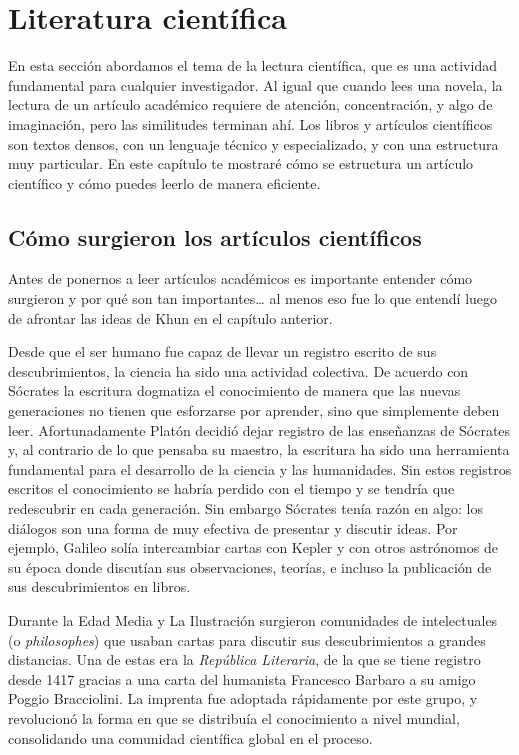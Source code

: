 \chapter{Literatura científica}
\label{cha:literaturacientifica}

En esta sección abordamos el tema de la lectura científica, que es una actividad
fundamental para cualquier investigador.
Al igual que cuando lees una novela, la lectura de un artículo académico
requiere de atención, concentración, y algo de imaginación, pero las similitudes
terminan ahí.
Los libros y artículos científicos son textos densos, con un lenguaje técnico y
especializado, y con una estructura muy particular.
En este capítulo te mostraré cómo se estructura un artículo científico y cómo
puedes leerlo de manera eficiente.

\section{Cómo surgieron los artículos científicos}
\label{sec:contexto}
Antes de ponernos a leer artículos académicos es importante entender cómo
surgieron y por qué son tan importantes… al menos eso fue lo que entendí luego
de afrontar las ideas de Khun en el capítulo anterior.

Desde que el ser humano fue capaz de llevar un registro escrito de sus
descubrimientos, la ciencia ha sido una actividad colectiva.
De acuerdo con Sócrates la escritura dogmatiza el conocimiento de manera que las
nuevas generaciones no tienen que esforzarse por aprender, sino que simplemente
deben leer.
Afortunadamente Platón decidió dejar registro de las enseñanzas de Sócrates y,
al contrario de lo que pensaba su maestro, la escritura ha sido una herramienta
fundamental para el desarrollo de la ciencia y las humanidades.
Sin estos registros escritos el conocimiento se habría perdido con el tiempo y
se tendría que redescubrir en cada generación.
Sin embargo Sócrates tenía razón en algo: los diálogos son una forma de
muy efectiva de presentar y discutir ideas.
Por ejemplo, Galileo solía intercambiar cartas con Kepler y con otros astrónomos
de su época donde discutían sus observaciones, teorías, e incluso la publicación
de sus descubrimientos en libros.

Durante la Edad Media y La Ilustración surgieron comunidades de intelectuales (o
\emph{philosophes}) que usaban cartas para discutir sus descubrimientos a
grandes distancias.
Una de estas era la \emph{República Literaria}, de la que se tiene registro
desde 1417 gracias a una carta del humanista Francesco Barbaro a su amigo Poggio
Bracciolini.
La imprenta fue adoptada rápidamente por este grupo, y revolucionó la forma en
que se distribuía el conocimiento a nivel mundial, consolidando una comunidad
científica global en el proceso.

